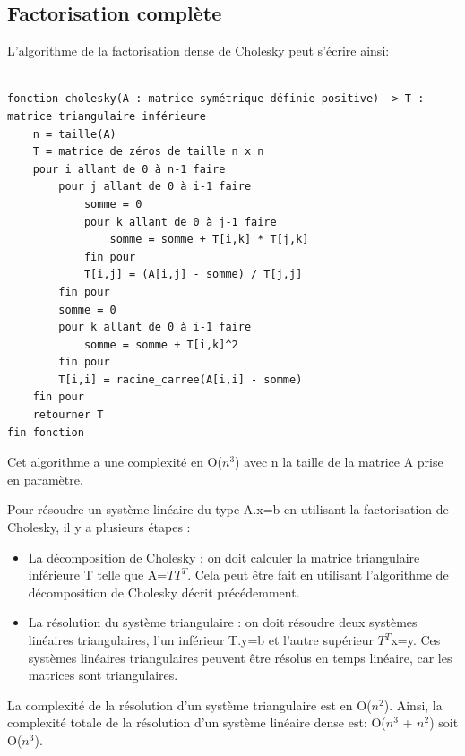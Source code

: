 \documentclass{article}
\begin{document}
\subsection{Factorisation complète}
\label{ssec:factor_compl}
L'algorithme de la factorisation dense de Cholesky peut s'écrire ainsi:
\begin{verbatim}

fonction cholesky(A : matrice symétrique définie positive) -> T : matrice triangulaire inférieure
    n = taille(A)
    T = matrice de zéros de taille n x n
    pour i allant de 0 à n-1 faire
        pour j allant de 0 à i-1 faire
            somme = 0
            pour k allant de 0 à j-1 faire
                somme = somme + T[i,k] * T[j,k]
            fin pour
            T[i,j] = (A[i,j] - somme) / T[j,j]
        fin pour
        somme = 0
        pour k allant de 0 à i-1 faire
            somme = somme + T[i,k]^2
        fin pour
        T[i,i] = racine_carree(A[i,i] - somme)
    fin pour
    retourner T
fin fonction

\end{verbatim}

Cet algorithme a une complexité en O($n^3$) avec n la taille de la matrice A prise en paramètre.

Pour résoudre un système linéaire du type A.x=b en utilisant la factorisation de Cholesky, il y a plusieurs étapes : 
\begin{itemize}
    \item La décomposition de Cholesky : on doit calculer la matrice triangulaire inférieure T telle que A=$TT^{T}$. Cela peut être fait en utilisant l'algorithme de décomposition de Cholesky décrit précédemment.
    \item La résolution du système triangulaire : on doit résoudre deux systèmes linéaires triangulaires, l'un inférieur T.y=b et l'autre supérieur $T^{T}$x=y. Ces systèmes linéaires triangulaires peuvent être résolus en temps linéaire, car les matrices sont triangulaires. 
\end{itemize}
La complexité de la résolution d'un système triangulaire est en O($n^2$). Ainsi, la complexité totale de la résolution d'un système linéaire dense est: O($n^3$ + $n^2$) soit O($n^3$). 
\end{document}
